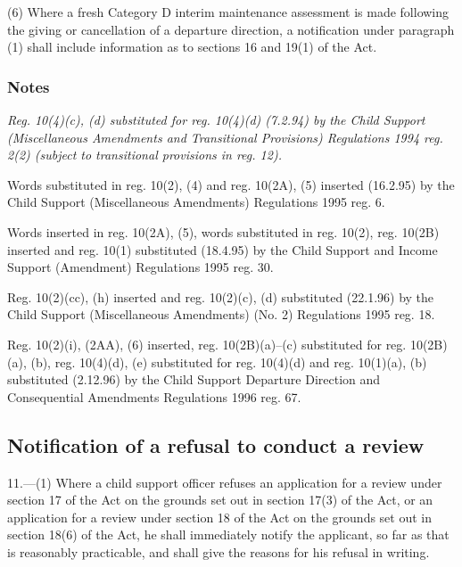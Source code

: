 \documentclass[a4paper]{article}
\newcommand\amendment[1]{\subsubsection*{Notes}{\itshape\frenchspacing\footnotesize #1 \par}}
\begin{document}
(6) Where a fresh Category D interim maintenance assessment is made following the giving or cancellation of a departure direction, a notification under paragraph (1) shall include information as to sections 16 and 19(1) of the Act.

\amendment{
Reg. 10(4)(c), (d) substituted for reg. 10(4)(d) (7.2.94) by the Child Support (Miscellaneous Amendments and Transitional Provisions) Regulations 1994 reg. 2(2) (subject to transitional provisions in reg. 12).

Words substituted in reg. 10(2), (4) and reg. 10(2A), (5) inserted (16.2.95) by the Child Support (Miscellaneous Amendments) Regulations 1995 reg. 6.

Words inserted in reg. 10(2A), (5), words substituted in reg. 10(2), reg. 10(2B) inserted and reg. 10(1) substituted (18.4.95) by the Child Support and Income Support (Amendment) Regulations 1995 reg. 30.

Reg. 10(2)(cc), (h) inserted and reg. 10(2)(c), (d) substituted (22.1.96) by the Child Support (Miscellaneous Amendments) (No. 2) Regulations 1995 reg. 18.

Reg. 10(2)(i), (2AA), (6) inserted, reg. 10(2B)(a)--(c) substituted for reg. 10(2B)(a), (b), reg. 10(4)(d), (e) substituted for reg. 10(4)(d) and reg. 10(1)(a), (b) substituted (2.12.96) by the Child Support Departure Direction and Consequential Amendments Regulations 1996 reg. 67.
}

\subsection[11. Notification of a refusal to conduct a review]{Notification of a refusal to conduct a review}

11.—(1) Where a child support officer refuses an application for a review under section 17 of the Act on the grounds set out in section 17(3) of the Act, or an application for a review under section 18 of the Act on the grounds set out in section 18(6) of the Act, he shall immediately notify the applicant, so far as that is reasonably practicable, and shall give the reasons for his refusal in writing.

%
\end{document}
